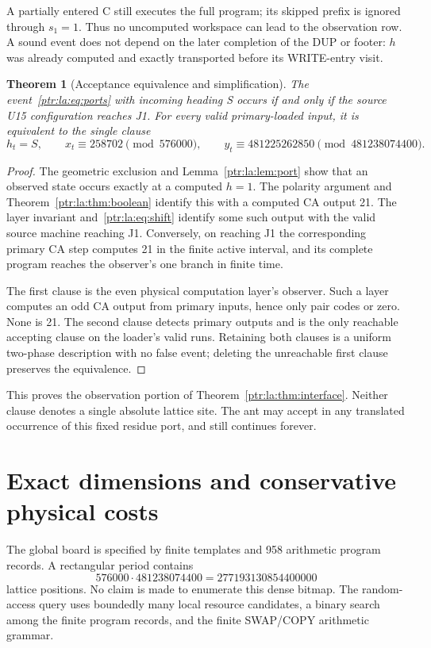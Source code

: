 \documentclass[11pt,letterpaper]{article}
\newtheorem{theorem}{Theorem}[section]
\theoremstyle{definition}\newtheorem{definition}[theorem]{Definition}
\theoremstyle{remark}\newtheorem{remark}[theorem]{Remark}
\begin{document}
A partially entered C still executes the full program; its skipped prefix is ignored through $s_1=1$. Thus no uncomputed workspace can lead to the observation row. A sound event does not depend on the later completion of the DUP or footer: $h$ was already computed and exactly transported before its WRITE-entry visit.

\begin{theorem}[Acceptance equivalence and simplification]\label{ptr:la:thm:accept}
The event~\eqref{ptr:la:eq:ports} with incoming heading S occurs if and only if the source U15 configuration reaches J1. For every valid primary-loaded input, it is equivalent to the single clause
\begin{equation}\label{ptr:la:eq:single}
 h_t=S,\qquad x_t\equiv258702\pmod{576000},\qquad
 y_t\equiv481225262850\pmod{481238074400}.
\end{equation}
\end{theorem}
\begin{proof}
The geometric exclusion and Lemma~\ref{ptr:la:lem:port} show that an observed state occurs exactly at a computed $h=1$. The polarity argument and Theorem~\ref{ptr:la:thm:boolean} identify this with a computed CA output 21. The layer invariant and~\eqref{ptr:la:eq:shift} identify some such output with the valid source machine reaching J1. Conversely, on reaching J1 the corresponding primary CA step computes 21 in the finite active interval, and its complete program reaches the observer's one branch in finite time.

The first clause is the even physical computation layer's observer. Such a layer computes an odd CA output from primary inputs, hence only pair codes or zero. None is 21. The second clause detects primary outputs and is the only reachable accepting clause on the loader's valid runs. Retaining both clauses is a uniform two-phase description with no false event; deleting the unreachable first clause preserves the equivalence.
\end{proof}
This proves the observation portion of Theorem~\ref{ptr:la:thm:interface}. Neither clause denotes a single absolute lattice site. The ant may accept in any translated occurrence of this fixed residue port, and still continues forever.

\section{Exact dimensions and conservative physical costs}\label{ptr:la:sec:bounds}
The global board is specified by finite templates and 958 arithmetic program records. A rectangular period contains
\[
576000\cdot481238074400=277193130854400000
\]
lattice positions. No claim is made to enumerate this dense bitmap. The random-access query uses boundedly many local resource candidates, a binary search among the finite program records, and the finite SWAP/COPY arithmetic grammar.
\end{document}

